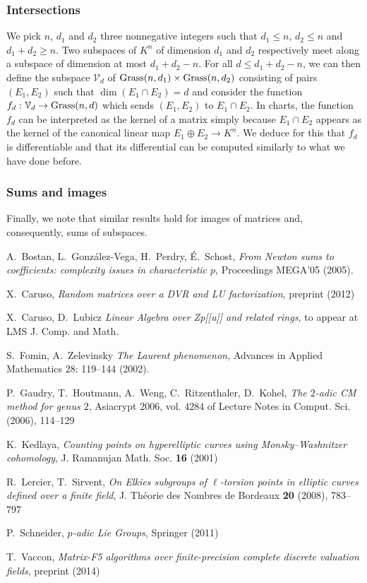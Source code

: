 \documentclass{lms}
\begin{document}
\subsubsection*{Intersections}

We pick $n$, $d_1$ and 
$d_2$ three nonnegative integers such that $d_1 \leq n$, $d_2 \leq n$ 
and $d_1 + d_2 \geq n$. Two subspaces of $K^n$ of dimension $d_1$ and 
$d_2$ respectively meet along a subspace of dimension at most $d_1 + d_2 
- n$. For all $d \leq d_1 + d_2 -n$, we can then define the subspace 
$\mathcal V_d$ of $\text{\rm Grass}(n,d_1) \times \text{\rm Grass}(n,d_2)$ consisting of 
pairs $(E_1, E_2)$ such that $\dim (E_1 \cap E_2) = d$ and consider the 
function $f_d : \mathcal V_d \to \Grass(n, d)$ which sends $(E_1, E_2)$ 
to $E_1 \cap E_2$. In charts, the function $f_d$ can be interpreted as
the kernel of a matrix simply because $E_1 \cap E_2$ appears as the
kernel of the canonical linear map $E_1 \oplus E_2 \to K^n$. We deduce
for this that $f_d$ is differentiable and that its differential can be
computed similarly to what we have done before.

\subsubsection*{Sums and images}

Finally, we note that similar results hold for images of matrices and,
consequently, sums of subspaces.

\begin{thebibliography}{10}

  A.~Bostan, L.~Gonz\'alez-Vega, H.~Perdry, \'E.~Schost,
  \emph{From Newton sums to coefficients: complexity issues in characteristic $p$},
  Proceedings MEGA'05 (2005).

  X.~Caruso,
  \emph{Random matrices over a DVR and LU factorization},
  preprint (2012)
  
  X.~Caruso, D.~Lubicz
  \emph{Linear Algebra over Zp[[u]] and related rings,} 
  to appear at LMS J. Comp. and Math. 

  S.~Fomin, A.~Zelevinsky
  \emph{The Laurent phenomenon,}   Advances in Applied Mathematics 28: 119–144 (2002).
  
  P.~Gaudry, T.~Houtmann, A.~Weng, C.~Ritzenthaler, D.~Kohel,
  \emph{The $2$-adic CM method for genus $2$}, 
  Asiacrypt 2006, vol. 4284 of Lecture Notes in Comput. Sci. (2006), 114--129

  K.~Kedlaya,
  \emph{Counting points on hyperelliptic curves using Monsky--Washnitzer cohomology}, 
  J. Ramanujan Math. Soc. {\bf 16} (2001)

  R.~Lercier, T.~Sirvent,
  \emph{On Elkies subgroups of $\ell$-torsion points in elliptic curves defined over a finite field},
  J. Th\'eorie des Nombres de Bordeaux {\bf 20} (2008), 783--797

  P.~Schneider,
  \emph{$p$-adic Lie Groups}, Springer (2011)

  T.~Vaccon,
  \emph{Matrix-F5 algorithms over finite-precision complete discrete 
  valuation fields},
  preprint (2014)
\end{thebibliography}
\end{document}
